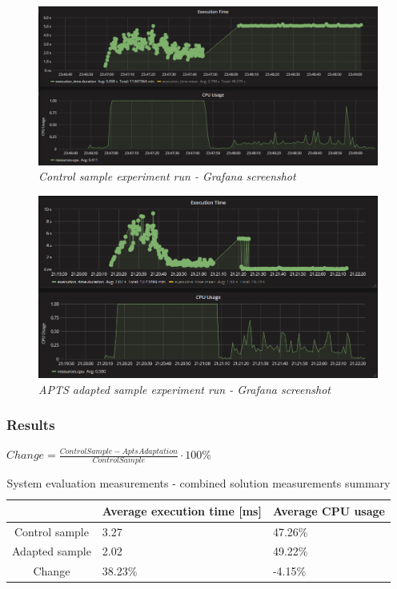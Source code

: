 \documentclass[10pt,a4paper]{article}
\begin{document}
\begin{figure}[!htb]
\centering
\includegraphics[width=1\textwidth]{combinedCtrl}
\caption{\textit{Control sample experiment run - Grafana screenshot}} \label{figure:combined:screen:control}
\end{figure}
\begin{figure}[!htb]
\centering
\includegraphics[width=1\textwidth]{combinedEval}
\caption{\textit{APTS adapted sample experiment run - Grafana screenshot}} \label{figure:combined:screen:adapted}
\end{figure}

\subsubsection{Results} 

\begin{center}
$Change = \frac{ControlSample - AptsAdaptation}{ControlSample}\cdot 100\%$
\end{center}

\begin{table}[ht]
\begin{center}
\caption{System evaluation measurements - combined solution measurements summary}
\begin{tabular}{c|C{3cm}C{3cm}}
    & Average execution time [ms] & Average CPU usage \\ \hline
    Control	sample	  &3.27     & 47.26\% \\ 
    Adapted sample	  &2.02	    & 49.22\% \\ \hline
    Change		      &38.23\%	& -4.15\%
\end{tabular}
\end{center}
\label{appendixmeasurementscombined}
\end{table}
\end{document}
